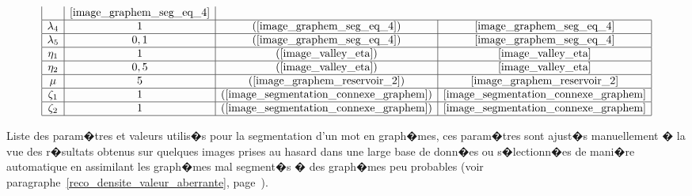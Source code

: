 \begin{table}[t]
$$\begin{array}{|c|c|c|c|}
                                                                                    & \pageref{image_graphem_seg_eq_4}    \\ \hline
            \lambda_4                    &     1                       &    (\ref{image_graphem_seg_eq_4})     
                                                                                    & \pageref{image_graphem_seg_eq_4}    \\ \hline
            \lambda_5                  &     0,1                      &    (\ref{image_graphem_seg_eq_4})     
                                                                                    & \pageref{image_graphem_seg_eq_4}    \\ \hline
            \eta_1                      &     1                        &    (\ref{image_valley_eta})                 
                                                                                    & \pageref{image_valley_eta}    \\ \hline
            \eta_2                      &     0,5                      &    (\ref{image_valley_eta})                 
                                                                                    & \pageref{image_valley_eta}    \\ \hline
            \mu                          &     5                        &    (\ref{image_graphem_reservoir_2}) 
                                                                                    & \pageref{image_graphem_reservoir_2}    \\ \hline
            \zeta_1                   &     1                        &    (\ref{image_segmentation_connexe_graphem}) 
                                                                                    & \pageref{image_segmentation_connexe_graphem}    \\ \hline
            \zeta_2                    &     1                        &    (\ref{image_segmentation_connexe_graphem}) 
                                                                                    & \pageref{image_segmentation_connexe_graphem}    \\ \hline
            \end{array}
            $$
            \caption{    Liste des param�tres et valeurs utilis�s pour la segmentation
                                d'un mot en graph�mes, ces param�tres sont ajust�s manuellement � la vue des r�sultats
                                obtenus sur quelques images prises 
                                au hasard dans une large base de donn�es ou s�lectionn�es de mani�re automatique
                                en assimilant les graph�mes mal segment�s � des graph�mes peu probables 
                                (voir paragraphe~\ref{reco_densite_valeur_aberrante}, page~\pageref{reco_densite_valeur_aberrante}).}
            \label{image_graphem_segmentation_parametre}
            \end{table}
            
